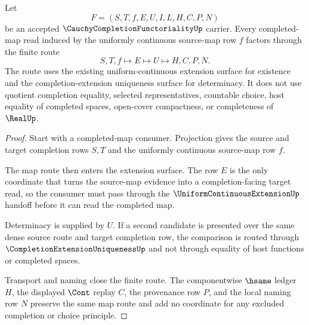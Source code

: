 \begin{theorem}
\label{thm:cauchy-completion-functoriality-map-route}
Let
$$
F=(S,T,f,E,U,I,L,H,C,P,N)
$$
be an accepted $\CauchyCompletionFunctorialityUp$ carrier. Every completed-map read induced by the uniformly continuous source-map row $f$ factors through the finite route
$$
S,T,f\longmapsto E\longmapsto U\longmapsto H,C,P,N .
$$
The route uses the existing uniform-continuous extension surface for existence and the completion-extension uniqueness surface for determinacy. It does not use quotient completion equality, selected representatives, countable choice, host equality of completed spaces, open-cover compactness, or completeness of $\RealUp$.
\end{theorem}
\begin{proof}
Start with a completed-map consumer. Projection gives the source and target completion rows $S,T$ and the uniformly continuous source-map row $f$.

The map route then enters the extension surface. The row $E$ is the only coordinate that turns the source-map evidence into a completion-facing target read, so the consumer must pass through the $\UniformContinuousExtensionUp$ handoff before it can read the completed map.

Determinacy is supplied by $U$. If a second candidate is presented over the same dense source route and target completion row, the comparison is routed through $\CompletionExtensionUniquenessUp$ and not through equality of host functions or completed spaces.

Transport and naming close the finite route. The componentwise $\hsame$ ledger $H$, the displayed $\Cont$ replay $C$, the provenance row $P$, and the local naming row $N$ preserve the same map route and add no coordinate for any excluded completion or choice principle.
\end{proof}

